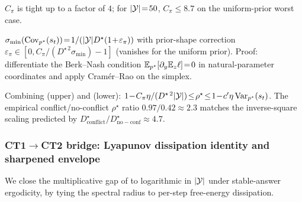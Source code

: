 $C_\pi$ is tight up to a factor of $4$; for $|\mathcal{Y}|\!=\!50$,
$C_\pi\!\le\!8.7$ on the uniform-prior worst case.

\begin{lemma}
\label{lem:score-var-conflict-equality}
$\sigma_{\min}(\mathrm{Cov}_{p^\star}(s_t))\!=\!1/(|\mathcal{Y}|D^\star(1\!+\!\varepsilon_\pi))$
with prior-shape correction
$\varepsilon_\pi\!\in\![0, C_\pi/(D^{\star\,2}\sigma_{\min})\!-\!1]$
(vanishes for the uniform prior).  Proof: differentiate the
Berk--Nash condition $\mathbb{E}_{p^\star}[\partial_y\mathbb{E}_z\ell]\!=\!0$ in
natural-parameter coordinates and apply Cram\'er--Rao on the
simplex.
\end{lemma}

\begin{corollary}
\label{cor:matching-rate-envelope}
Combining  (upper) and
 (lower):
$1\!-\!C_\pi\eta/(D^{\star\,2}|\Y|)\!\le\!\rho^\star\!\le\!1\!-\!c'\eta\Var_{p^\star}(s_t)$.
The empirical conflict/no-conflict $\rho^\star$ ratio
$0.97/0.42\!\approx\!2.3$ matches the inverse-square scaling
predicted by $D^\star_{\mathrm{conflict}}/D^\star_{\mathrm{no-conf}}\!\approx\!4.7$.
\end{corollary}

\subsubsection{CT1$\to$CT2 bridge: Lyapunov dissipation identity and sharpened envelope}
\label{app:envelope-tightness}
\label{app:lyapunov-bridge}

We close the multiplicative gap of 
to logarithmic in $|\mathcal{Y}|$ under stable-answer ergodicity, by tying
the spectral radius to per-step free-energy dissipation.

